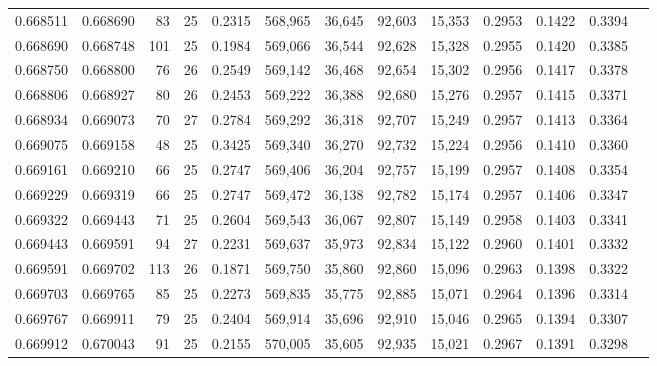 \begin{tabular}{rrrrrrrrrrrrr}
0.668511 & 0.668690 &  83 &  25 &                                     0.2315 & 568,965 &  36,645 &  92,603 &  15,353 & 0.2953 & 0.1422 & 0.3394 \\
0.668690 & 0.668748 & 101 &  25 &                                     0.1984 & 569,066 &  36,544 &  92,628 &  15,328 & 0.2955 & 0.1420 & 0.3385 \\
0.668750 & 0.668800 &  76 &  26 &                                     0.2549 & 569,142 &  36,468 &  92,654 &  15,302 & 0.2956 & 0.1417 & 0.3378 \\
0.668806 & 0.668927 &  80 &  26 &                                     0.2453 & 569,222 &  36,388 &  92,680 &  15,276 & 0.2957 & 0.1415 & 0.3371 \\
0.668934 & 0.669073 &  70 &  27 &                                     0.2784 & 569,292 &  36,318 &  92,707 &  15,249 & 0.2957 & 0.1413 & 0.3364 \\
0.669075 & 0.669158 &  48 &  25 &                                     0.3425 & 569,340 &  36,270 &  92,732 &  15,224 & 0.2956 & 0.1410 & 0.3360 \\
0.669161 & 0.669210 &  66 &  25 &                                     0.2747 & 569,406 &  36,204 &  92,757 &  15,199 & 0.2957 & 0.1408 & 0.3354 \\
0.669229 & 0.669319 &  66 &  25 &                                     0.2747 & 569,472 &  36,138 &  92,782 &  15,174 & 0.2957 & 0.1406 & 0.3347 \\
0.669322 & 0.669443 &  71 &  25 &                                     0.2604 & 569,543 &  36,067 &  92,807 &  15,149 & 0.2958 & 0.1403 & 0.3341 \\
0.669443 & 0.669591 &  94 &  27 &                                     0.2231 & 569,637 &  35,973 &  92,834 &  15,122 & 0.2960 & 0.1401 & 0.3332 \\
0.669591 & 0.669702 & 113 &  26 &                                     0.1871 & 569,750 &  35,860 &  92,860 &  15,096 & 0.2963 & 0.1398 & 0.3322 \\
0.669703 & 0.669765 &  85 &  25 &                                     0.2273 & 569,835 &  35,775 &  92,885 &  15,071 & 0.2964 & 0.1396 & 0.3314 \\
0.669767 & 0.669911 &  79 &  25 &                                     0.2404 & 569,914 &  35,696 &  92,910 &  15,046 & 0.2965 & 0.1394 & 0.3307 \\
0.669912 & 0.670043 &  91 &  25 &                                     0.2155 & 570,005 &  35,605 &  92,935 &  15,021 & 0.2967 & 0.1391 & 0.3298 \\

\end{tabular}
